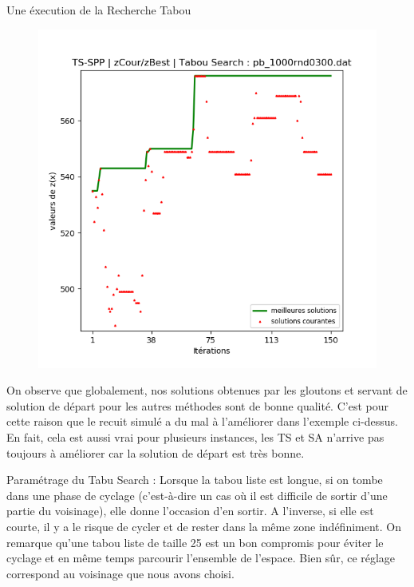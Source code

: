 \begin{example}
  Une éxecution de la Recherche Tabou
  \begin{figure}[htb!]
    \centering
    \includegraphics[scale=0.5]{fig/tabou.png}
    \label{fig:recuit}
  \end{figure}
\end{example}

On observe que globalement, nos solutions obtenues par les gloutons et servant de solution de départ pour les autres méthodes sont de bonne qualité. C'est pour cette raison que le recuit simulé a du mal à l'améliorer dans l'exemple ci-dessus. En fait, cela est aussi vrai pour plusieurs instances, les TS et SA n'arrive pas toujours à améliorer car la solution de départ est très bonne.


Paramétrage du Tabu Search : Lorsque la tabou liste est longue, si on tombe dans une phase de cyclage (c'est-à-dire un cas où il est difficile de sortir d'une partie du voisinage), elle donne l'occasion d'en sortir. A l'inverse, si elle est courte, il y a le risque de cycler et de rester dans la même zone indéfiniment. On remarque qu'une tabou liste de taille 25 est un bon compromis pour éviter le cyclage et en même temps parcourir l'ensemble de l'espace. Bien sûr, ce réglage correspond au voisinage que nous avons choisi.

